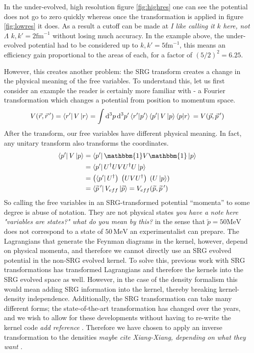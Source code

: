 \documentclass[a4paper,11pt]{article}
\newcommand{\dd}{\mathrm{d}}
\newcommand{\wtil}[1]{\widetilde{#1}}
\newcommand{\br}[1]{\left\langle #1 \right |}
\newcommand{\kt}[1]{\left| #1 \right \rangle}
\newcommand{\brkt}[2]{\left \langle #1 |#2 \right \rangle}
\newcommand{\ques}[1]{\color{red}\textit{ #1 }\color{black}}
\newcommand{\MeV}{\mathrm{MeV}}
\begin{document}
In the under-evolved, high resolution figure \ref{fig:highres} one can
see the potential does not go to zero quickly whereas once the
transformation is applied in figure \ref{fig:lowres} it does. As a
result a cutoff can be made at \ques{I like calling it $k$ here, not $\Lambda$} $k,k'=2 \mathrm{fm}^{-1}$ without
losing much accuracy. In the example above, the under-evolved
potential had to be considered up to $k,k'=5\mathrm{fm}^{-1}$, this means an efficiency
gain proportional to the areas of each, for a factor of $(5/2)^2=6.25$.

However, this creates another problem: the SRG transform creates a
change in the physical meaning of the free variables.
To understand this, let us first consider an example the reader is
certainly more familiar with - a Fourier transformation which changes
a potential from position to momentum space.
\begin{equation}
  V(\vec{r},\vec{r}\,')= \br{r'} V \kt{r}=
  \int \dd^3p\, \dd^3p' \brkt{r'}{p'} \br{p'}V\kt{p} \brkt{p}{r}\\
  =V(\vec{p},\vec{p}\,')
\end{equation}
After the transform, our free variables have different physical
meaning. In fact, any unitary transform also transforms the coordinates.
\begin{align}
  \br{p'}V\kt{p} &= \br{p'} \mathbbm{1} V \mathbbm{1} \kt{p}\nonumber\\
  &= \br{p'} U^\dag U V U^\dag U \kt{p}\nonumber\\
  &= \left(\br{p'} U^\dag\right)\;\left( U V U^\dag\right)\;\left( U
  \kt{p}\right)\\
  &= \br{\widetilde{p}\,'} V_{eff}
  \kt{\widetilde{p}}=V_{eff}(\widetilde{p},\widetilde{p}\,')\nonumber
\end{align}
So calling the free variables in an SRG-transformed potential
``momenta'' to some degree is abuse of notation.
They are not physical states \ques{you have a note here "variables are states?" what do you mean by this?} in the sense that $\wtil{p}=50 \MeV$
does not correspond to a state of $50 \,\MeV$ an experimentalist can prepare.
The Lagrangians that generate the Feynman diagrams in the kernel, however,
depend on physical momenta, and therefore we cannot directly use an SRG 
evolved potential in the non-SRG evolved kernel.
To solve this, previous work with SRG transformations has transformed
Lagrangians and therefore the kernels into the SRG evolved space as well. However, in
the case of the density formalism this would mean adding SRG
information into the kernel, thereby breaking kernel-density independence.
Additionally, the SRG transformation can take many different forms; 
the state-of-the-art transformation has
changed over the years, and we wish to allow for these developments
without having to re-write the kernel code \ques{add reference}.
Therefore we have chosen to apply an inverse
transformation to the densities\ques{maybe cite Xiang-Xiang, depending on what they want}.
\end{document}
